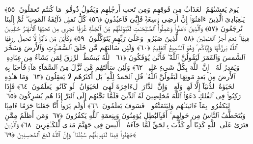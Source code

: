  يَومَ يَغشَىٰهُمُ ٱلعَذَابُ مِن فَوقِهِم وَمِن تَحتِ أَرجُلِهِم وَيَقُولُ ذُوقُوا۟ مَا كُنتُم تَعمَلُونَ ﴿٥٥﴾
 يَـٰعِبَادِىَ ٱلَّذِينَ ءَامَنُوٓا۟ إِنَّ أَرضِى وَٟسِعَةٌۭ فَإِيَّٰىَ فَٱعبُدُونِ ﴿٥٦﴾
 كُلُّ نَفسٍۢ ذَآئِقَةُ ٱلمَوتِ ۖ ثُمَّ إِلَينَا تُرجَعُونَ ﴿٥٧﴾
 وَٱلَّذِينَ ءَامَنُوا۟ وَعَمِلُوا۟ ٱلصَّـٰلِحَـٰتِ لَنُبَوِّئَنَّهُم مِّنَ ٱلجَنَّةِ غُرَفًۭا تَجرِى مِن تَحتِهَا ٱلأَنهَـٰرُ خَـٰلِدِينَ فِيهَا ۚ نِعمَ أَجرُ ٱلعَـٰمِلِينَ ﴿٥٨﴾
 ٱلَّذِينَ صَبَرُوا۟ وَعَلَىٰ رَبِّهِم يَتَوَكَّلُونَ ﴿٥٩﴾
 وَكَأَيِّن مِّن دَآبَّةٍۢ لَّا تَحمِلُ رِزقَهَا ٱللَّهُ يَرزُقُهَا وَإِيَّاكُم ۚ وَهُوَ ٱلسَّمِيعُ ٱلعَلِيمُ ﴿٦٠﴾
 وَلَئِن سَأَلتَهُم مَّن خَلَقَ ٱلسَّمَـٰوَٟتِ وَٱلأَرضَ وَسَخَّرَ ٱلشَّمسَ وَٱلقَمَرَ لَيَقُولُنَّ ٱللَّهُ ۖ فَأَنَّىٰ يُؤفَكُونَ ﴿٦١﴾
 ٱللَّهُ يَبسُطُ ٱلرِّزقَ لِمَن يَشَآءُ مِن عِبَادِهِۦ وَيَقدِرُ لَهُۥٓ ۚ إِنَّ ٱللَّهَ بِكُلِّ شَىءٍ عَلِيمٌۭ ﴿٦٢﴾
 وَلَئِن سَأَلتَهُم مَّن نَّزَّلَ مِنَ ٱلسَّمَآءِ مَآءًۭ فَأَحيَا بِهِ ٱلأَرضَ مِنۢ بَعدِ مَوتِهَا لَيَقُولُنَّ ٱللَّهُ ۚ قُلِ ٱلحَمدُ لِلَّهِ ۚ بَل أَكثَرُهُم لَا يَعقِلُونَ ﴿٦٣﴾
 وَمَا هَـٰذِهِ ٱلحَيَوٰةُ ٱلدُّنيَآ إِلَّا لَهوٌۭ وَلَعِبٌۭ ۚ وَإِنَّ ٱلدَّارَ ٱلءَاخِرَةَ لَهِىَ ٱلحَيَوَانُ ۚ لَو كَانُوا۟ يَعلَمُونَ ﴿٦٤﴾
 فَإِذَا رَكِبُوا۟ فِى ٱلفُلكِ دَعَوُا۟ ٱللَّهَ مُخلِصِينَ لَهُ ٱلدِّينَ فَلَمَّا نَجَّىٰهُم إِلَى ٱلبَرِّ إِذَا هُم يُشرِكُونَ ﴿٦٥﴾
 لِيَكفُرُوا۟ بِمَآ ءَاتَينَـٰهُم وَلِيَتَمَتَّعُوا۟ ۖ فَسَوفَ يَعلَمُونَ ﴿٦٦﴾
 أَوَلَم يَرَوا۟ أَنَّا جَعَلنَا حَرَمًا ءَامِنًۭا وَيُتَخَطَّفُ ٱلنَّاسُ مِن حَولِهِم ۚ أَفَبِٱلبَٰطِلِ يُؤمِنُونَ وَبِنِعمَةِ ٱللَّهِ يَكفُرُونَ ﴿٦٧﴾
 وَمَن أَظلَمُ مِمَّنِ ٱفتَرَىٰ عَلَى ٱللَّهِ كَذِبًا أَو كَذَّبَ بِٱلحَقِّ لَمَّا جَآءَهُۥٓ ۚ أَلَيسَ فِى جَهَنَّمَ مَثوًۭى لِّلكَـٰفِرِينَ ﴿٦٨﴾
 وَٱلَّذِينَ جَٰهَدُوا۟ فِينَا لَنَهدِيَنَّهُم سُبُلَنَا ۚ وَإِنَّ ٱللَّهَ لَمَعَ ٱلمُحسِنِينَ ﴿٦٩﴾
 
